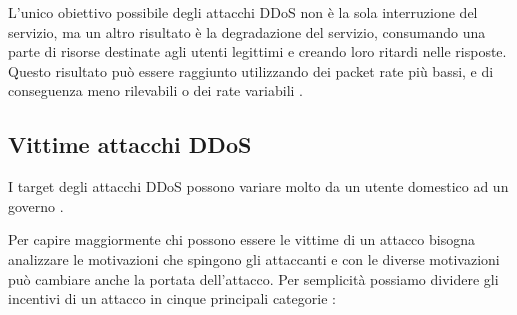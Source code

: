 
L'unico obiettivo possibile degli attacchi DDoS non è la sola interruzione del servizio, ma un altro risultato è la degradazione del servizio, consumando una parte di risorse destinate agli utenti legittimi e creando loro ritardi nelle risposte. Questo risultato può essere raggiunto utilizzando dei packet rate più bassi, e di conseguenza meno rilevabili o dei rate variabili \cite{ddos_survey_3, ddos_survey_4}.

\subsection{Vittime attacchi DDoS}

I target degli attacchi DDoS possono variare molto da un utente domestico ad un governo \cite{ddos_motivations}.


Per capire maggiormente chi possono essere le vittime di un attacco bisogna analizzare le motivazioni che spingono gli attaccanti e con le diverse motivazioni può cambiare anche la portata dell'attacco. Per semplicità possiamo dividere gli incentivi di un attacco in cinque principali categorie \cite{ddos_survey_1}\cite{ddos_motivations}:

